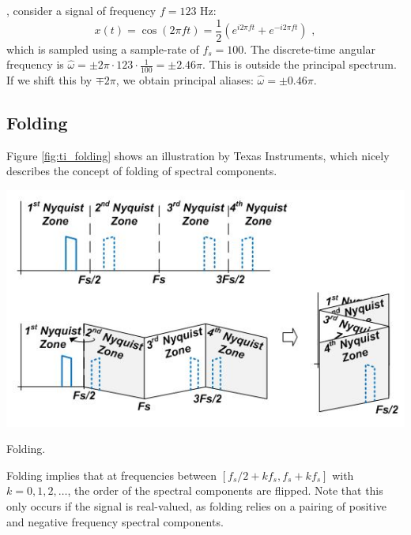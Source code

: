 , consider a signal of frequency $f=123$ Hz:
\begin{equation}
  x(t) =\cos( 2\pi f t) = \frac{1}{2}(e^{i 2\pi f t}+e^{-i 2\pi f t})\,\,,
\end{equation}
which is sampled using a sample-rate of $f_s=100$. The discrete-time angular frequency is $\hat{\omega} = \pm 2\pi \cdot 123 \cdot\frac{1}{100} = \pm 2.46\pi$. This is outside the principal spectrum. If we shift this by $\mp 2\pi$, we obtain principal aliases:
$\hat{\omega} = \pm 0.46 \pi$.

\subsection{Folding}
Figure \ref{fig:ti_folding} shows an illustration by Texas Instruments, which nicely describes the concept of folding of spectral components.

\begin{marginfigure}[-4cm]
\begin{center}
\includegraphics[width=\textwidth]{ch09/figures/folding.JPG}
\end{center}
\caption{Folding.}
\label{fig:ti_folding}
\end{marginfigure}

Folding implies that at frequencies between $[f_s/2+k f_s,f_s + kf_s]$ with $k=0,1,2,\ldots$, the order of the spectral components are flipped. Note that this only occurs if the signal is real-valued, 
as folding relies on a pairing of positive and negative frequency spectral components.

